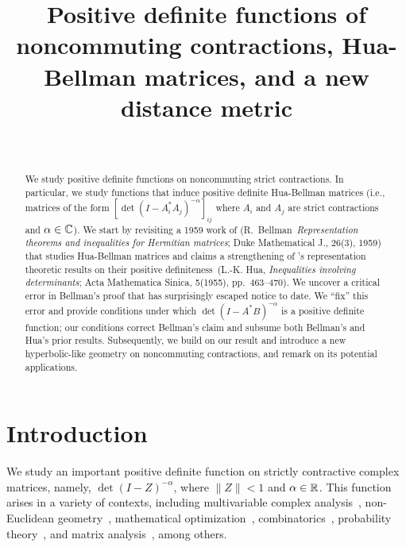 \documentclass[11pt]{article}
\begin{document}
\title{Positive definite functions of noncommuting contractions, Hua-Bellman matrices, and a new distance metric}
\author{ \\ }

\maketitle


\begin{abstract}
  We study positive definite functions on noncommuting strict contractions. In particular, we study functions that induce positive definite Hua-Bellman matrices (i.e., matrices of the form $[\det(I-A_i^*A_j)^{-\alpha}]_{ij}$ where $A_i$ and $A_j$ are strict contractions and $\alpha\in\mathbb{C}$). We start by revisiting a 1959 work of \citeauthor{bellman1959} (R.~Bellman~\emph{Representation theorems and inequalities for Hermitian matrices}; Duke Mathematical J., 26(3), 1959) that studies Hua-Bellman matrices and claims a strengthening of \citeauthor{hua1955}'s representation theoretic results on their positive definiteness~(L.-K. Hua, \emph{Inequalities involving determinants}; Acta Mathematica Sinica, 5(1955), pp.~463--470). We uncover a critical error in Bellman's proof that has surprisingly escaped notice to date. We ``fix'' this error and provide conditions under which $\det(I-A^*B)^{-\alpha}$ is a positive definite function; our conditions correct Bellman's claim and subsume both Bellman's and Hua's prior results. Subsequently, we  build on our result and introduce a new hyperbolic-like geometry on noncommuting contractions, and remark on its potential applications.
\end{abstract}

\section{Introduction}
We study an important positive definite function on strictly contractive complex matrices, namely, $\det(I-Z)^{-\alpha}$, where $\|Z\| < 1$ and $\alpha \in \mathbb{R}$. This function arises in a variety of contexts, including multivariable complex analysis~\citep{hua1955}, non-Euclidean geometry~\citep{sra2016}, mathematical optimization~\citep{sra2015}, combinatorics~\citep{branden2012,verejones1988}, probability theory~\citep{shirai2007}, and matrix analysis~\citep{fzhang2009,xuXu2009,ando2008}, among others.
\end{document}
